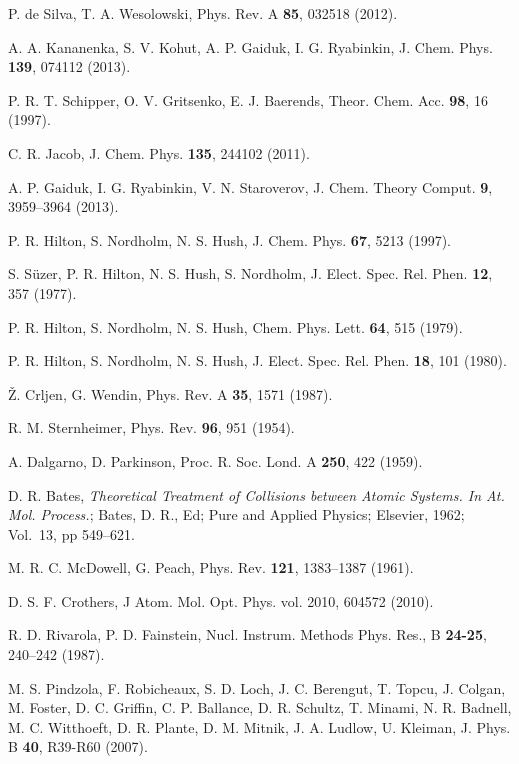 \begin{thebibliography}{9}
P. de Silva, T. A. Wesolowski,
Phys. Rev. A \textbf{85}, 032518 (2012).

A. A. Kananenka, S. V. Kohut, A. P. Gaiduk, I. G. Ryabinkin, 
J. Chem. Phys. \textbf{139}, 074112 (2013).

P. R. T. Schipper, O. V. Gritsenko, E. J. Baerends,
Theor. Chem. Acc. \textbf{98}, 16 (1997).

C. R. Jacob,
J. Chem. Phys. \textbf{135}, 244102 (2011).

A. P. Gaiduk, I. G. Ryabinkin, V. N. Staroverov, 
J. Chem. Theory Comput. \textbf{9}, 3959--3964 (2013).

P. R. Hilton, S. Nordholm, N. S. Hush, 
J. Chem. Phys. \textbf{67}, 5213 (1997).

S. S{\"u}zer, P. R. Hilton, N. S. Hush, S. Nordholm,
J. Elect. Spec. Rel. Phen. \textbf{12}, 357 (1977).

P. R. Hilton, S. Nordholm, N. S. Hush,
Chem. Phys. Lett. \textbf{64}, 515 (1979).

P. R. Hilton, S. Nordholm, N. S. Hush, 
J. Elect. Spec. Rel. Phen. \textbf{18}, 101 (1980).

{\v Z}. Crljen, G. Wendin,
Phys. Rev. A \textbf{35}, 1571 (1987).

R. M. Sternheimer, 
Phys. Rev. \textbf{96}, 951 (1954).

A. Dalgarno, D. Parkinson,
Proc. R. Soc. Lond. A \textbf{250}, 422 (1959).

D. R. Bates, 
\textit{Theoretical Treatment of Collisions between Atomic Systems.
In At. Mol. Process.};
Bates, D. R., Ed;
Pure and Applied Physics;
Elsevier, 1962;
Vol.~13, pp 549--621.

M. R. C. McDowell, G. Peach, 
Phys. Rev. \textbf{121}, 1383--1387 (1961).

D. S. F. Crothers,
J Atom. Mol. Opt. Phys. vol. 2010, 604572 (2010).

R. D. Rivarola, P. D. Fainstein,
Nucl. Instrum. Methods Phys. Res., B \textbf{24-25}, 240--242 (1987).

M. S. Pindzola, F. Robicheaux, S. D. Loch, J. C. Berengut, T. Topcu, 
J. Colgan, M. Foster, D. C. Griffin, C. P. Ballance, D. R. Schultz,
T. Minami, N. R. Badnell, M. C. Witthoeft, D. R. Plante, D. M. Mitnik, 
J. A. Ludlow, U. Kleiman, 
J. Phys. B \textbf{40}, R39-R60 (2007).


\end{thebibliography}
